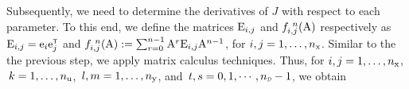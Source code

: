 Subsequently, we need to determine the derivatives of $J$ with respect to each parameter. To this end, we define the matrices ${ \mathrm{E} }_{i,j}$ and $f_{i,j}^{\ n}({ \mathrm{A} })$ respectively as $\mxE_{i,j} = \vce_i\vce_j^\tr$ and $f_{i,j}^{\ n}({ \mathrm{A} }) := \sum_{r=0}^{n-1} { \mathrm{A} }^{r}{ \mathrm{E} }_{i,j}{ \mathrm{A} }^{n-1}$, for $i,j=1,\ldots,n_{ \mathrm{x} }$. 
Similar to the the previous step, we apply matrix calculus techniques. 
Thus, 
for $i,j=1,\ldots,n_{ \mathrm{x} }$, $\, k = 1,\ldots,n_{ \mathrm{u} }$, $\, l,m=1,\ldots,n_{ \mathrm{y} }$, and $\, t,s = 0,1,\cdots,\nD-1$, we obtain
